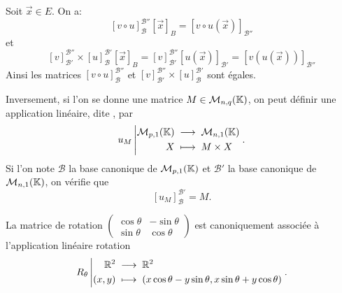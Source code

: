 \documentclass{book}
\begin{document}
\begin{Demonstration}
Soit $\vec{x}\in E$. On a:
$$  [v\circ u]_{\mathcal{B}}^{\mathcal{B}''}[\vec{x}]_B=[v\circ u(\vec{x})]_{\mathcal{B}''} $$
et
$$  [v]_{\mathcal{B}'}^{\mathcal{B}''} \times [u]_{\mathcal{B}}^{\mathcal{B}'}[\vec{x}]_B=[v]_{\mathcal{B}'}^{\mathcal{B}''}[u(\vec{x})]_{\mathcal{B}'}=[v( u(\vec{x}))]_{\mathcal{B}''} $$
Ainsi les matrices $[v\circ u]_{\mathcal{B}}^{\mathcal{B}''}$ et $[v]_{\mathcal{B}'}^{\mathcal{B}''} \times [u]_{\mathcal{B}}^{\mathcal{B}'}$ sont égales. 
\end{Demonstration}
\begin{Definition}
Inversement, si l'on se donne une matrice $M \in   \mathcal{M}_{n,q}(\mathbb{K}) $,
on peut définir une application linéaire, dite , par
\[ {u_M}\left|\begin{aligned}{\mathcal{M}_{p,1}(\mathbb{K})}&\;\longrightarrow\;{\mathcal{M}_{n,1}(\mathbb{K})}\\{X}&\;\longmapsto\;{M\times X}\end{aligned}\right..\]
Si l'on note $\mathcal{B}$ la base canonique de $\mathcal{M}_{p,1}(\mathbb{K})$ et $\mathcal{B}'$ la base canonique de $\mathcal{M}_{n,1}(\mathbb{K})$,
on vérifie  que
\[ [u_M]_{\mathcal{B}}^{\mathcal{B}'} = M. \]
\end{Definition}

\begin{Exemple}
La matrice de rotation $\begin{pmatrix}\cos \theta & -\sin \theta\\ \sin \theta & \cos \theta\end{pmatrix}$ est canoniquement associée à l'application linéaire rotation $${R_\theta}\left|\begin{aligned}{\mathbb {R}^2 }&\;\longrightarrow\;{\mathbb {R}^2}\\{(x,y)}&\;\longmapsto\;{ (x\cos \theta - y \sin \theta,x\sin \theta + y \cos \theta)}\end{aligned}\right..$$ 
\end{Exemple}
\end{document}
